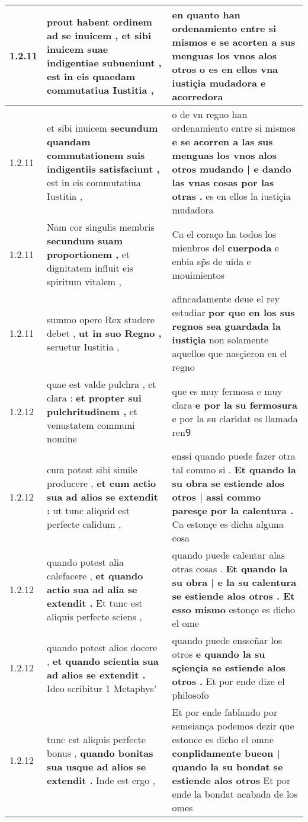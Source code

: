 \begin{tabular}{|p{1cm}|p{6.5cm}|p{6.5cm}|}
1.2.11 & prout habent ordinem ad se inuicem , \textbf{ et sibi inuicem suae indigentiae subueniunt , } est in eis quaedam commutatiua Iustitia , & en quanto han ordenamiento entre si mismos \textbf{ e se acorten a sus menguas los vnos alos otros } o es en ellos vna iustiçia mudadora e acorredora \\\hline
1.2.11 & et sibi inuicem \textbf{ secundum quandam commutationem suis indigentiis satisfaciunt , } est in eis commutatiua Iustitia , & o de vn regno han ordenamiento entre si mismos \textbf{ e se acorren a las sus menguas los vnos alos otros mudando | e dando las vnas cosas por las otras . } es en ellos la iustiçia mudadora \\\hline
1.2.11 & Nam cor singulis membris \textbf{ secundum suam proportionem , } et dignitatem influit eis spiritum vitalem , & Ca el coraço ha todos los mienbros del \textbf{ cuerpoda } e enbia sp̃s de uida e mouimientos \\\hline
1.2.11 & summo opere Rex studere debet , \textbf{ ut in suo Regno , } seruetur Iustitia , & afincadamente deue el rey estudiar \textbf{ por que en los sus regnos sea guardada la iustiçia } non solamente aquellos que nasçieron en el regno \\\hline
1.2.12 & quae est valde pulchra , et clara : \textbf{ et propter sui pulchritudinem , } et venustatem communi nomine & que es muy fermosa e muy clara \textbf{ e por la su fermosura } e por la su claridat es llamada renꝮ \\\hline
1.2.12 & cum potest sibi simile producere , \textbf{ et cum actio sua ad alios se extendit : } ut tunc aliquid est perfecte calidum , & enssi quando puede fazer otra tal commo si . \textbf{ Et quando la su obra se estiende alos otros | assi commo paresçe por la calentura . } Ca estonçe es dicha alguna cosa \\\hline
1.2.12 & quando potest alia calefacere , \textbf{ et quando actio sua ad alia se extendit . } Et tunc est aliquis perfecte sciens , & quando puede calentar alas otras cosas . \textbf{ Et quando la su obra | e la su calentura se estiende alos otros . Et esso mismo } estonçe es dicho el ome \\\hline
1.2.12 & quando potest alios docere , \textbf{ et quando scientia sua ad alios se extendit . } Ideo scribitur 1 Metaphys’ & quando puede ensseñar los otros \textbf{ e quando la su sçiençia se estiende alos otros . } Et por ende dize el philosofo \\\hline
1.2.12 & tunc est aliquis perfecte bonus , \textbf{ quando bonitas sua usque ad alios se extendit . } Inde est ergo , & Et por ende fablando por semeiança podemos dezir que estonce es dicho el omne \textbf{ conplidamente bueon | quando la su bondat se estiende alos otros } Et por ende la bondat acabada de los omes \\\hline

\end{tabular}
